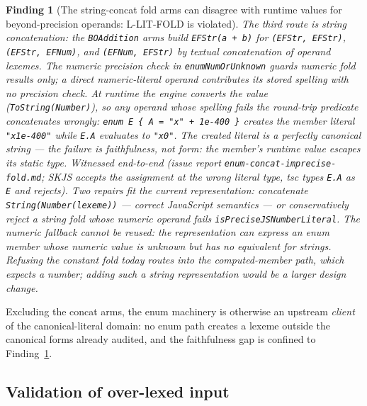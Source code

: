\documentclass[11pt]{article}
\newtheorem{finding}[theorem]{Finding}
\begin{document}
\begin{finding}[The string-concat fold arms can disagree with runtime values for
beyond-precision operands: L-LIT-FOLD is violated]
\label{find:enumfold}
The third route is string concatenation: the \texttt{BOAddition} arms
build \texttt{EFStr(a + b)} for \texttt{(EFStr, EFStr)},
\texttt{(EFStr, EFNum)}, and \texttt{(EFNum, EFStr)} by textual
concatenation of operand \emph{lexemes}. The numeric precision check in
\texttt{enumNumOrUnknown} guards numeric fold \emph{results} only; a
direct numeric-literal operand contributes its stored spelling with no
precision check. At runtime the engine converts the \emph{value}
(\texttt{ToString(Number)}), so any operand whose spelling fails the
round-trip predicate concatenates wrongly:
\texttt{enum E \{ A = "x" + 1e-400 \}} creates the member literal
\texttt{"x1e-400"} while \texttt{E.A} evaluates to \texttt{"x0"}. The
created literal is a perfectly canonical \emph{string} — the failure is
faithfulness, not form: the member's runtime value escapes its static
type. Witnessed end-to-end (issue report
\texttt{enum-concat-imprecise-fold.md}; SKJS accepts the assignment at
the wrong literal type, tsc types \texttt{E.A} as \texttt{E} and
rejects). Two repairs fit the current representation: concatenate
\texttt{String(Number(lexeme))} — correct JavaScript semantics — or
conservatively \emph{reject} a string fold whose numeric operand fails
\texttt{isPreciseJSNumberLiteral}. The numeric fallback cannot be reused:
the representation can express an enum member whose numeric value is
unknown but has no equivalent for strings. Refusing the constant fold
today routes into the computed-member path, which expects a number;
adding such a string representation would be a larger design change.
\end{finding}

Excluding the concat arms, the enum machinery is otherwise an
upstream \emph{client} of the canonical-literal domain: no enum path
creates a lexeme outside the canonical forms already audited, and the
faithfulness gap is confined to Finding~\ref{find:enumfold}.

\subsection{Validation of over-lexed input}
\label{sec:validation}
\end{document}
